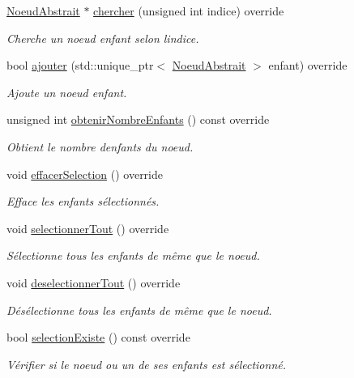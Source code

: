 \begin{DoxyCompactItemize}
\hyperlink{class_noeud_abstrait}{Noeud\+Abstrait} $\ast$ \hyperlink{group__inf2990_ga9f6cf297ac93d75711e1ae85cb0a69ed}{chercher} (unsigned int indice) override
\begin{DoxyCompactList}\small\item\em Cherche un noeud enfant selon l\textquotesingle{}indice. \end{DoxyCompactList}\item 
bool \hyperlink{group__inf2990_ga5651862ed875690375d9a82a06ecdcb2}{ajouter} (std\+::unique\+\_\+ptr$<$ \hyperlink{class_noeud_abstrait}{Noeud\+Abstrait} $>$ enfant) override
\begin{DoxyCompactList}\small\item\em Ajoute un noeud enfant. \end{DoxyCompactList}\item 
unsigned int \hyperlink{group__inf2990_ga4cb7898e88b8726f93dfe588105472d4}{obtenir\+Nombre\+Enfants} () const  override
\begin{DoxyCompactList}\small\item\em Obtient le nombre d\textquotesingle{}enfants du noeud. \end{DoxyCompactList}\item 
void \hyperlink{group__inf2990_ga7e3aa1018378eb5e0342b2fe530783cc}{effacer\+Selection} () override
\begin{DoxyCompactList}\small\item\em Efface les enfants sélectionnés. \end{DoxyCompactList}\item 
void \hyperlink{group__inf2990_ga1fb05aa01553f1fa6738711ab172efb6}{selectionner\+Tout} () override
\begin{DoxyCompactList}\small\item\em Sélectionne tous les enfants de même que le noeud. \end{DoxyCompactList}\item 
void \hyperlink{group__inf2990_ga98d6f93f7dc06301f8909e8cf31e3e9e}{deselectionner\+Tout} () override
\begin{DoxyCompactList}\small\item\em Désélectionne tous les enfants de même que le noeud. \end{DoxyCompactList}\item 
bool \hyperlink{group__inf2990_ga3f0b30a39e8e6384e6e3227582c678e0}{selection\+Existe} () const  override
\begin{DoxyCompactList}\small\item\em Vérifier si le noeud ou un de ses enfants est sélectionné. \end{DoxyCompactList}\item 

\end{DoxyCompactItemize}
